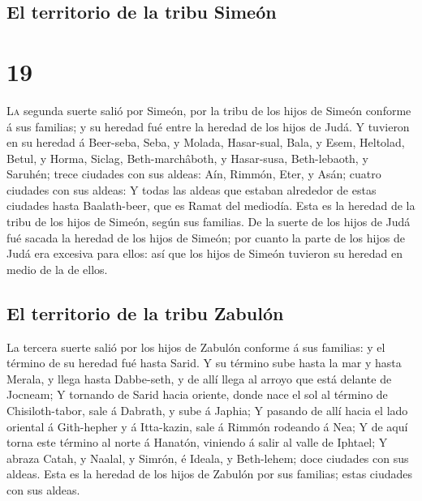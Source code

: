 \hypertarget{el-territorio-de-la-tribu-simeuxf3n}{%
\subsection{El territorio de la tribu
Simeón}\label{el-territorio-de-la-tribu-simeuxf3n}}

\hypertarget{section-18}{%
\section{19}\label{section-18}}

 \textsc{La} segunda suerte salió por Simeón, por la tribu
de los hijos de Simeón conforme á sus familias; y su heredad fué entre
la heredad de los hijos de Judá.  Y tuvieron en su heredad
á Beer-seba, Seba, y Molada,  Hasar-sual, Bala, y Esem,
 Heltolad, Betul, y Horma,  Siclag,
Beth-marchâboth, y Hasar-susa,  Beth-lebaoth, y Saruhén;
trece ciudades con sus aldeas:  Aín, Rimmón, Eter, y Asán;
cuatro ciudades con sus aldeas:  Y todas las aldeas que
estaban alrededor de estas ciudades hasta Baalath-beer, que es Ramat del
mediodía. Esta es la heredad de la tribu de los hijos de Simeón, según
sus familias.  De la suerte de los hijos de Judá fué
sacada la heredad de los hijos de Simeón; por cuanto la parte de los
hijos de Judá era excesiva para ellos: así que los hijos de Simeón
tuvieron su heredad en medio de la de ellos.

\hypertarget{el-territorio-de-la-tribu-zabuluxf3n}{%
\subsection{El territorio de la tribu
Zabulón}\label{el-territorio-de-la-tribu-zabuluxf3n}}

 La tercera suerte salió por los hijos de Zabulón
conforme á sus familias: y el término de su heredad fué hasta Sarid.
 Y su término sube hasta la mar y hasta Merala, y llega
hasta Dabbe-seth, y de allí llega al arroyo que está delante de Jocneam;
 Y tornando de Sarid hacia oriente, donde nace el sol al
término de Chisiloth-tabor, sale á Dabrath, y sube á Japhia;
 Y pasando de allí hacia el lado oriental á Gith-hepher y
á Itta-kazin, sale á Rimmón rodeando á Nea;  Y de aquí
torna este término al norte á Hanatón, viniendo á salir al valle de
Iphtael;  Y abraza Catah, y Naalal, y Simrón, é Ideala, y
Beth-lehem; doce ciudades con sus aldeas.  Esta es la
heredad de los hijos de Zabulón por sus familias; estas ciudades con sus
aldeas.

